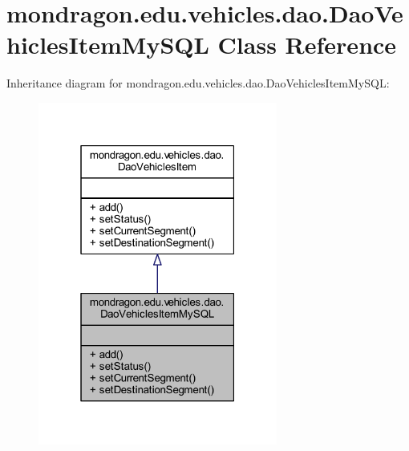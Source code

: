\hypertarget{classmondragon_1_1edu_1_1vehicles_1_1dao_1_1_dao_vehicles_item_my_s_q_l}{}\section{mondragon.\+edu.\+vehicles.\+dao.\+Dao\+Vehicles\+Item\+My\+S\+QL Class Reference}
\label{classmondragon_1_1edu_1_1vehicles_1_1dao_1_1_dao_vehicles_item_my_s_q_l}


Inheritance diagram for mondragon.\+edu.\+vehicles.\+dao.\+Dao\+Vehicles\+Item\+My\+S\+QL\+:\nopagebreak
\begin{figure}[H]
\begin{center}
\leavevmode
\includegraphics[width=223pt]{classmondragon_1_1edu_1_1vehicles_1_1dao_1_1_dao_vehicles_item_my_s_q_l__inherit__graph}
\end{center}
\end{figure}


